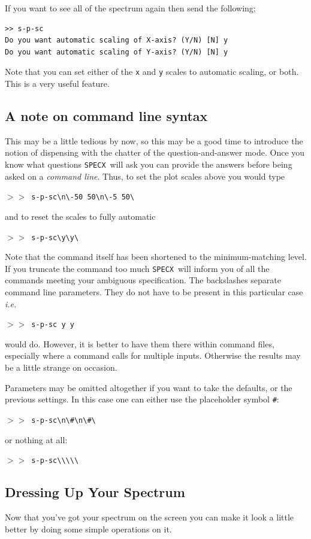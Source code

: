 \documentclass[11pt,twoside]{article}
\newcommand{\ie}{{\it i.e.}}
\newcommand{\SPECX}{{\tt SPECX}}
\newcommand{\SP}{{$>\!>$}}
\begin{document}
If you want to see all of the spectrum again then send the following;

\begin{verbatim}
>> s-p-sc
Do you want automatic scaling of X-axis? (Y/N) [N] y
Do you want automatic scaling of Y-axis? (Y/N) [N] y
\end{verbatim}

Note that you can set either of the {\tt x} and {\tt y} scales to
automatic scaling, or both. This is a very useful feature.

\subsection{A note on command line syntax}
\label{sec:command-line}
This may be a little tedious by now, so this may be a good time to
introduce the notion of dispensing with the chatter of the
question-and-answer mode.  Once you know what questions \SPECX\ will
ask you can provide the answers before being asked on a {\it command
line}.  Thus, to set the plot scales above you would type

\SP\ \verb|s-p-sc\n\-50 50\n\-5 50\ |

and to reset the scales to fully automatic

\SP\ \verb|s-p-sc\y\y\ |

Note that the command itself has been shortened to the
minimum-matching level.  If you truncate the command too much \SPECX\
will inform you of all the commands meeting your ambiguous
specification. The backslashes separate command line parameters. They
do not have to be present in this particular case \ie\

\SP\ \verb|s-p-sc y y |

would do. However, it is better to have them there within command
files, especially where a command calls for multiple inputs. Otherwise
the results may be a little strange on occasion.

Parameters may be omitted altogether if you want to take the defaults,
or the previous settings. In this case one can either use the
placeholder symbol
\verb+#+:

\SP\ \verb|s-p-sc\n\#\n\#\ |

or nothing at all:

\SP\ \verb|s-p-sc\\\\\ |

\subsection{Dressing Up Your Spectrum}
\label{sec:specx_5.2}
Now that you've got your spectrum on the screen you can make it look a
little better by doing some simple operations on it.
\end{document}
